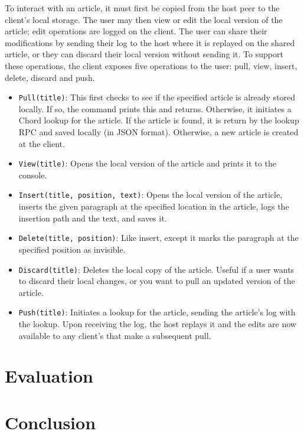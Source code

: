 \documentclass[twocolumn]{article}
\begin{document}
To interact with an article, it must first be copied from the host peer to the client's local storage. The user may then view or edit the local version of the article; edit operations are logged on the client. The user can share their modifications by sending their log to the host where it is replayed on the shared article, or they can discard their local version without sending it. To support these operations, the client exposes five operations to the user: pull, view, insert, delete, discard and push.
\begin{itemize}
  \item \texttt{Pull(title)}: This first checks to see if the specified article is already stored locally. If so, the command prints this and returns. Otherwise, it initiates a Chord lookup for the article. If the article is found, it is return by the lookup RPC and saved locally (in JSON format). Otherwise, a new article is created at the client.
  \item \texttt{View(title)}: Opens the local version of the article and prints it to the console.
  \item \texttt{Insert(title, position, text)}: Opens the local version of the article, inserts the given paragraph at the specified location in the article, logs the insertion path and the text, and saves it.
  \item \texttt{Delete(title, position)}: Like insert, except it marks the paragraph at the specified position as invisible.
  \item \texttt{Discard(title)}: Deletes the local copy of the article. Useful if a user wants to discard their local changes, or you want to pull an updated version of the article.
  \item \texttt{Push(title)}: Initiates a lookup for the article, sending the article's log with the lookup. Upon receiving the log, the host replays it and the edits are now available to any client's that make a subsequent pull.
\end{itemize}

\section{Evaluation}

\section{Conclusion}




\end{document}
